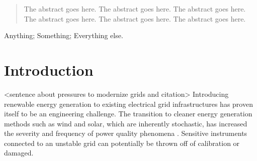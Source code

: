 \documentclass[10pt,conference,compsocconf]{IEEEtran}
\begin{document}




\maketitle


\begin{abstract}
The abstract goes here.
The abstract goes here.
The abstract goes here.
The abstract goes here.
The abstract goes here.
The abstract goes here.
\end{abstract}


\begin{IEEEkeywords}
Anything; Something; Everything else.%
\end{IEEEkeywords}



%
\IEEEpeerreviewmaketitle



\section{Introduction}
<sentence about pressures to modernize grids and citation>
Introducing renewable energy generation to existing electrical grid infrastructures has proven itself to be an engineering challenge. The transition to cleaner energy generation methods such as wind and solar, which are inherently stochastic, has increased the severity and frequency of power quality phenomena \cite{Radu:2014:RenewableImpacts}. Sensitive instruments connected to an unstable grid can potentially be thrown off of calibration or damaged.
\end{document}
